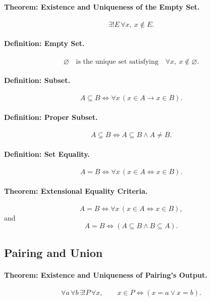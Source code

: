 \paragraph{Theorem: Existence and Uniqueness of the Empty Set.}
\[
  \exists!E\,\forall x,\ x\notin E.
\]

\paragraph{Definition: Empty Set.}
\[
  \varnothing
  \quad\text{is the unique set satisfying}\quad
  \forall x,\ x\notin\varnothing.
\]

\paragraph{Definition: Subset.}
\[
  A\subseteq B
  \Longleftrightarrow
  \forall x\,(x\in A\to x\in B).
\]

\paragraph{Definition: Proper Subset.}
\[
  A\subsetneq B
  \Longleftrightarrow
  A\subseteq B\land A\neq B.
\]

\paragraph{Definition: Set Equality.}
\[
  A=B
  \Longleftrightarrow
  \forall x\,(x\in A\Longleftrightarrow x\in B).
\]

\paragraph{Theorem: Extensional Equality Criteria.}
\[
  A=B
  \Longleftrightarrow
  \forall x\,(x\in A\Longleftrightarrow x\in B),
\]
and
\[
  A=B
  \Longleftrightarrow
  (A\subseteq B\land B\subseteq A).
\]

\subsection*{Pairing and Union}

\paragraph{Theorem: Existence and Uniqueness of Pairing's Output.}
\[
  \forall a\,\forall b\,\exists!P\,\forall x,\qquad
  x\in P\Longleftrightarrow (x=a\lor x=b).
\]

